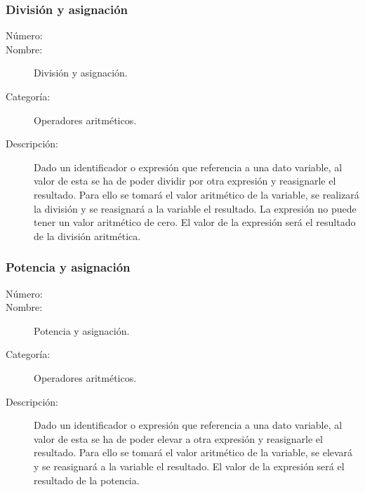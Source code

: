 \subsubsection{División y asignación}
\begin{framed}
	\begin{description}
		\item [Número:] \cn
		\item [Nombre:] División y asignación.
		\item [Categoría:] Operadores aritméticos.
		\item [Descripción:] Dado un identificador o expresión que referencia a una dato variable, al valor de esta se ha de poder dividir por
		otra expresión y reasignarle el resultado. Para ello se tomará el valor aritmético de la variable, se realizará la división y se reasignará a la variable el resultado. La expresión no puede tener un valor aritmético de cero.
		El valor de la expresión será el resultado de la división aritmética.
	\end {description}
\end{framed}

\subsubsection{Potencia y asignación}
\begin{framed}
	\begin{description}
		\item [Número:] \cn
		\item [Nombre:] Potencia y asignación.
		\item [Categoría:] Operadores aritméticos.
		\item [Descripción:] Dado un identificador o expresión que referencia a una dato variable, al valor de esta se ha de poder elevar a
		otra expresión y reasignarle el resultado. Para ello se tomará el valor aritmético de la variable, se elevará  y se reasignará a la variable el resultado. El valor de la expresión será el resultado de la potencia.
	\end {description}
\end{framed}

